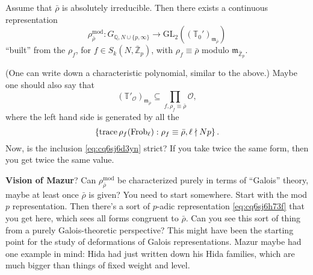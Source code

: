 \documentclass[reqno]{amsart} 
\begin{document}
\begin{theorem}\label{theorem:cq6thpm721}
  Assume that $\bar{\rho}$ is absolutely irreducible.  Then there exists a continuous representation
  \begin{equation}\label{eq:cq6sj6h73f}
    \rho_{\bar{\rho}}^{\mathrm{mod}} : G_{\mathbb{Q}, N \cup \{p, \infty\}} \rightarrow \mathrm{GL}_2 \left((\mathbb{T}_0 ')_{\mathfrak{m}_{\bar{\rho}}} \right)
  \end{equation}
  ``built'' from the $\rho_f$, for $f \in S_k(N, \bar{\mathbb{Z}}_p)$, with $\rho_f \equiv \bar{\rho}$ modulo $\mathfrak{m}_{\bar{\mathbb{Z}}_p}$.
\end{theorem}
(One can write down a characteristic polynomial, similar to the above.)  Maybe one should also say that
\begin{equation}\label{eq:cq6sj6d3yn}
  \left( \mathbb{T} '_{\mathcal{O}} \right)_{\mathfrak{m}_{\bar{\rho}}} \subseteq \prod_{f, \rho_f \equiv \bar{\rho}} \mathcal{O},
\end{equation}
where the left hand side is generated by all the
\begin{equation*}
  \left\{ \operatorname{trace} \rho_f(\operatorname{Frob}_{\ell}) : \rho_f \equiv \bar{\rho}, \ell \nmid N p \right\}.
\end{equation*}
Now, is the inclusion \eqref{eq:cq6sj6d3yn} strict?  If you take twice the same form, then you get twice the same value.

\textbf{Vision of Mazur}?  Can $\rho_{\bar{\rho}}^{\mathrm{mod}}$ be characterized purely in terms of ``Galois'' theory, maybe at least once $\bar{\rho}$ is given?  You need to start somewhere.  Start with the mod $p$ representation.  Then there's a sort of $p$-adic representation \eqref{eq:cq6sj6h73f} that you get here, which sees all forms congruent to $\bar{\rho}$.  Can you see this sort of thing from a purely Galois-theoretic perspective?  This might have been the starting point for the study of deformations of Galois representations.  Mazur maybe had one example in mind: Hida had just written down his Hida families, which are much bigger than things of fixed weight and level.
\end{document}
